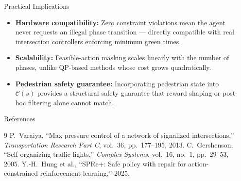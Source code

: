 \documentclass[final,20pt]{beamer}
\newlength{\sepwidth}
\newlength{\colwidth}
\newcommand{\separatorcolumn}{\begin{column}{\sepwidth}\end{column}}
\begin{document}
\begin{frame}[t]
\begin{columns}[t]
\begin{column}{\colwidth}
  \begin{exampleblock}{Practical Implications}
    \begin{itemize}
      \item \textbf{Hardware compatibility:} Zero constraint violations mean the
        agent never requests an illegal phase transition --- directly compatible
        with real intersection controllers enforcing minimum green times.
      \item \textbf{Scalability:} Feasible-action masking scales linearly with
        the number of phases, unlike QP-based methods whose cost grows
        quadratically.
      \item \textbf{Pedestrian safety guarantee:} Incorporating pedestrian state
        into $\mathcal{C}(s)$ provides a structural safety guarantee that
        reward shaping or post-hoc filtering alone cannot match.
    \end{itemize}
  \end{exampleblock}

  \begin{block}{References}
    \footnotesize
    \begin{thebibliography}{9}
        P.~Varaiya, ``Max pressure control of a network of signalized
        intersections,'' \textit{Transportation Research Part C}, vol.~36,
        pp.~177--195, 2013.
        C.~Gershenson, ``Self-organizing traffic lights,''
        \textit{Complex Systems}, vol.~16, no.~1, pp.~29--53, 2005.
        Y.-H.~Hung et al., ``SPRe+: Safe policy with repair for
        action-constrained reinforcement learning,'' 2025.
    \end{thebibliography}
  \end{block}

\end{column}
\separatorcolumn

\end{columns}
\end{frame}
\end{document}
